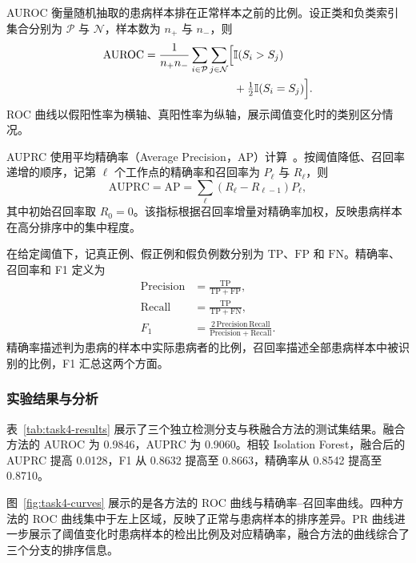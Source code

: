 AUROC 衡量随机抽取的患病样本排在正常样本之前的比例。设正类和负类索引集合分别为 $\mathcal P$ 与 $\mathcal N$，样本数为 $n_+$ 与 $n_-$，则
\begin{equation}
\begin{aligned}
  \mathrm{AUROC}
  =\frac{1}{n_+n_-}\sum_{i\in\mathcal P}\sum_{j\in\mathcal N}
  \Bigl[&\mathbb I(S_i>S_j)\\
  &+\tfrac12\mathbb I(S_i=S_j)\Bigr].
\end{aligned}
\label{eq:task4-auroc}
\end{equation}
ROC 曲线以假阳性率为横轴、真阳性率为纵轴，展示阈值变化时的类别区分情况。

AUPRC 使用平均精确率（Average Precision，AP）计算~\cite{sklearn2026ap}。按阈值降低、召回率递增的顺序，记第 $\ell$ 个工作点的精确率和召回率为 $P_\ell$ 与 $R_\ell$，则
\begin{equation}
  \mathrm{AUPRC}=\mathrm{AP}
  =\sum_{\ell}(R_\ell-R_{\ell-1})P_\ell,
  \label{eq:task4-ap}
\end{equation}
其中初始召回率取 $R_0=0$。该指标根据召回率增量对精确率加权，反映患病样本在高分排序中的集中程度。

在给定阈值下，记真正例、假正例和假负例数分别为 $\mathrm{TP}$、$\mathrm{FP}$ 和 $\mathrm{FN}$。精确率、召回率和 F1 定义为
\begin{equation}
\begin{aligned}
  \mathrm{Precision}&=\frac{\mathrm{TP}}{\mathrm{TP}+\mathrm{FP}},\\
  \mathrm{Recall}&=\frac{\mathrm{TP}}{\mathrm{TP}+\mathrm{FN}},\\
  F_1&=\frac{2\,\mathrm{Precision}\,\mathrm{Recall}}
                 {\mathrm{Precision}+\mathrm{Recall}}.
\end{aligned}
\label{eq:task4-classification-metrics}
\end{equation}
精确率描述判为患病的样本中实际患病者的比例，召回率描述全部患病样本中被识别的比例，F1 汇总这两个方面。


\subsubsection{实验结果与分析}
表~\ref{tab:task4-results} 展示了三个独立检测分支与秩融合方法的测试集结果。融合方法的 AUROC 为 0.9846，AUPRC 为 0.9060。相较 Isolation Forest，融合后的 AUPRC 提高 0.0128，F1 从 0.8632 提高至 0.8663，精确率从 0.8542 提高至 0.8710。

图~\ref{fig:task4-curves} 展示的是各方法的 ROC 曲线与精确率--召回率曲线。四种方法的 ROC 曲线集中于左上区域，反映了正常与患病样本的排序差异。PR 曲线进一步展示了阈值变化时患病样本的检出比例及对应精确率，融合方法的曲线综合了三个分支的排序信息。

